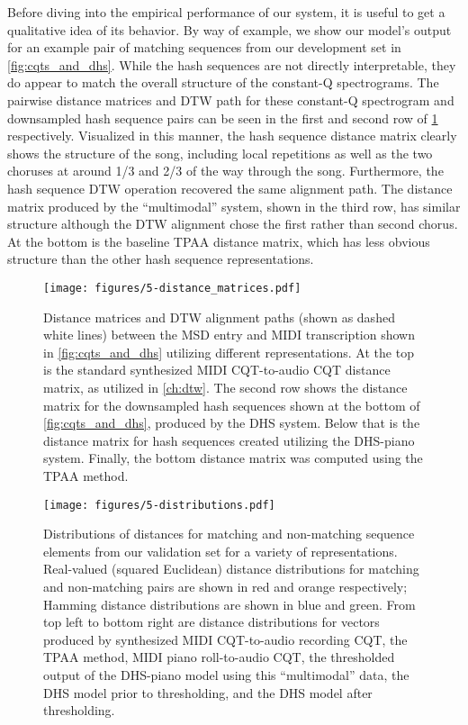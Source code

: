 Before diving into the empirical performance of our system, it is useful to get a qualitative idea of its behavior.
By way of example, we show our model's output for an example pair of matching sequences from our development set in \cref{fig:cqts_and_dhs}.
While the hash sequences are not directly interpretable, they do appear to match the overall structure of the constant-Q spectrograms.
The pairwise distance matrices and DTW path for these constant-Q spectrogram and downsampled hash sequence pairs can be seen in the first and second row of \cref{fig:distance_matrices} respectively.
Visualized in this manner, the hash sequence distance matrix clearly shows the structure of the song, including local repetitions as well as the two choruses at around 1/3 and 2/3 of the way through the song.
Furthermore, the hash sequence DTW operation recovered the same alignment path.
The distance matrix produced by the ``multimodal'' system, shown in the third row, has similar structure although the DTW alignment chose the first rather than second chorus.
At the bottom is the baseline TPAA distance matrix, which has less obvious structure than the other hash sequence representations.

\begin{figure}
  \texttt{[image: figures/5-distance\_matrices.pdf]}
  \caption[Distance matrices utilizing different representations]{Distance matrices and DTW alignment paths (shown as dashed white lines) between the MSD entry and MIDI transcription shown in \cref{fig:cqts_and_dhs} utilizing different representations.
At the top is the standard synthesized MIDI CQT-to-audio CQT distance matrix, as utilized in \cref{ch:dtw}.
The second row shows the distance matrix for the downsampled hash sequences shown at the bottom of \cref{fig:cqts_and_dhs}, produced by the DHS system.
Below that is the distance matrix for hash sequences created utilizing the DHS-piano system.
Finally, the bottom distance matrix was computed using the TPAA method.}
  \label{fig:distance_matrices}
\end{figure}

\begin{figure}
  \texttt{[image: figures/5-distributions.pdf]}
  \caption[Distributions of matching and non-matching distances]{Distributions of distances for matching and non-matching sequence elements from our validation set for a variety of representations.
Real-valued (squared Euclidean) distance distributions for matching and non-matching pairs are shown in red and orange respectively; Hamming distance distributions are shown in blue and green.
From top left to bottom right are distance distributions for vectors produced by synthesized MIDI CQT-to-audio recording CQT, the TPAA method, MIDI piano roll-to-audio CQT, the thresholded output of the DHS-piano model using this ``multimodal'' data, the DHS model prior to thresholding, and the DHS model after thresholding.}
  \label{fig:distributions}
\end{figure}

